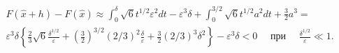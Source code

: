 \begin{task}
    $$
    \begin{gathered}
    F(\hat{x}+h)-F(\hat{x}) \approx \int_{0}^{\delta} \sqrt{6} t^{1 / 2} \varepsilon^{2} d t-\varepsilon^{3} \delta+\int_{0}^{3 / 2} \sqrt{6} t^{1 / 2} a^{2} d t+\frac{3}{2} a^{3}= \\
    \varepsilon^{3} \delta\left\{\frac{2}{3} \sqrt{6} \frac{\delta^{1 / 2}}{\varepsilon}+\left(\frac{3}{2}\right)^{3 / 2}(2 / 3)^{2} \frac{\delta}{\varepsilon}+\frac{3}{2}(2 / 3)^{3} \delta^{2}\right\}-\varepsilon^{3} \delta<0 \quad \text { при } \quad \frac{\delta^{1 / 2}}{\varepsilon} \ll 1 .
    \end{gathered}
    $$
\end{task}